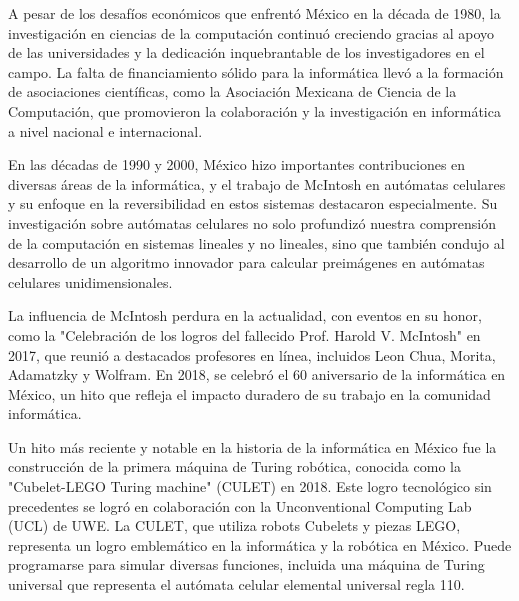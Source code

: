 \documentclass[12pt]{article} %
\begin{document}
	
	A pesar de los desafíos económicos que enfrentó México en la década de 1980, la investigación en ciencias de la computación continuó creciendo gracias al apoyo de las universidades y la dedicación inquebrantable de los investigadores en el campo. La falta de financiamiento sólido para la informática llevó a la formación de asociaciones científicas, como la Asociación Mexicana de Ciencia de la Computación, que promovieron la colaboración y la investigación en informática a nivel nacional e internacional.
	
	En las décadas de 1990 y 2000, México hizo importantes contribuciones en diversas áreas de la informática, y el trabajo de McIntosh en autómatas celulares y su enfoque en la reversibilidad en estos sistemas destacaron especialmente. Su investigación sobre autómatas celulares no solo profundizó nuestra comprensión de la computación en sistemas lineales y no lineales, sino que también condujo al desarrollo de un algoritmo innovador para calcular preimágenes en autómatas celulares unidimensionales.
	
	La influencia de McIntosh perdura en la actualidad, con eventos en su honor, como la "Celebración de los logros del fallecido Prof. Harold V. McIntosh" en 2017, que reunió a destacados profesores en línea, incluidos Leon Chua, Morita, Adamatzky y Wolfram. En 2018, se celebró el 60 aniversario de la informática en México, un hito que refleja el impacto duradero de su trabajo en la comunidad informática.
	
	Un hito más reciente y notable en la historia de la informática en México fue la construcción de la primera máquina de Turing robótica, conocida como la "Cubelet-LEGO Turing machine" (CULET) en 2018. Este logro tecnológico sin precedentes se logró en colaboración con la Unconventional Computing Lab (UCL) de UWE. La CULET, que utiliza robots Cubelets y piezas LEGO, representa un logro emblemático en la informática y la robótica en México. Puede programarse para simular diversas funciones, incluida una máquina de Turing universal que representa el autómata celular elemental universal regla 110.
	
	
	
\end{document}

